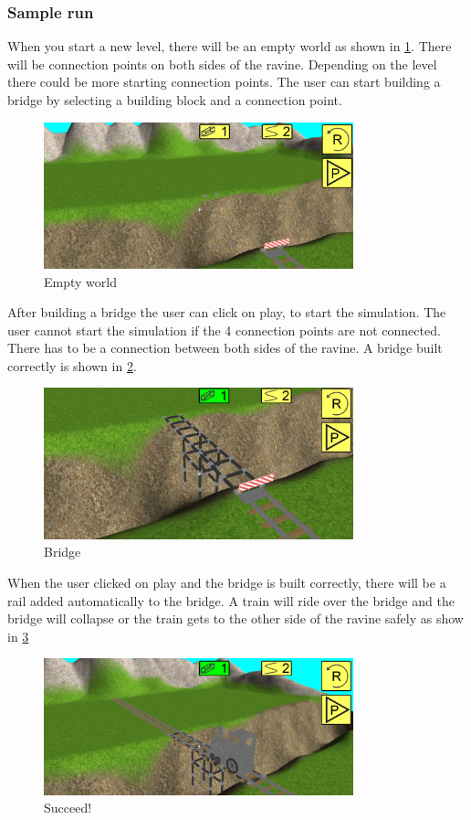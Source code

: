 \subsubsection{Sample run}
When you start a new level, there will be an empty world as shown in \ref{fig:startup}. There will be connection points on both sides of the ravine. Depending on the level there could be more starting connection points. The user can start building a bridge by selecting a building block and a connection point. 
\begin{figure}[H]
    \centering
    \includegraphics[width=0.8\textwidth]{screenshots/initial.png}
    \caption{Empty world}
    \label{fig:startup}
\end{figure}
After building a bridge the user can click on play, to start the simulation. The user cannot start the simulation if the 4 connection points are not connected. There has to be a connection between both sides of the ravine. A bridge built correctly is shown in \ref{fig:fullbridge}.
\begin{figure}[H]
    \centering
    \includegraphics[width=0.8\textwidth]{screenshots/fullbridge.png}
    \caption{Bridge}
    \label{fig:fullbridge}
\end{figure}
When the user clicked on play and the bridge is built correctly, there will be a rail added automatically to the bridge. A train will ride over the bridge and the bridge will collapse or the train gets to the other side of the ravine safely as show in \ref{fig:full}
\begin{figure}[H]
    \centering
    \includegraphics[width=0.8\textwidth]{screenshots/Drives.png}
    \caption{Succeed!}
    \label{fig:full}
\end{figure}

